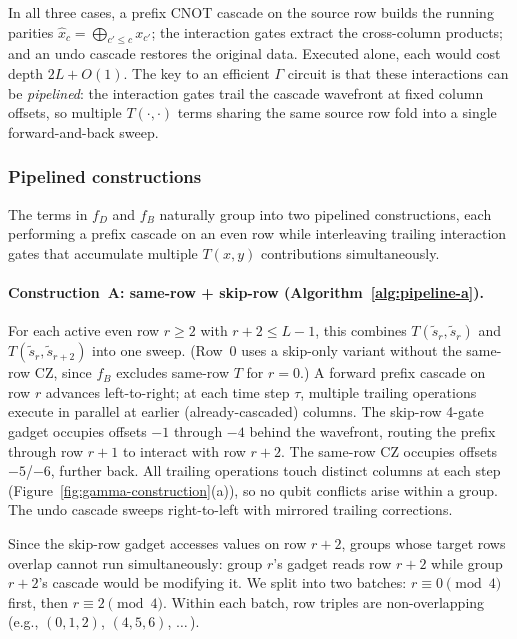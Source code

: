 \medskip
In all three cases, a prefix CNOT cascade on the source row builds the running parities $\hat{x}_c = \bigoplus_{c' \le c} x_{c'}$; the interaction gates extract the cross-column products; and an undo cascade restores the original data.
Executed alone, each would cost depth $2L + O(1)$.
The key to an efficient $\Gamma$ circuit is that these interactions can be \emph{pipelined}: the interaction gates trail the cascade wavefront at fixed column offsets, so multiple $T(\cdot,\cdot)$ terms sharing the same source row fold into a single forward-and-back sweep.


\subsubsection{Pipelined constructions}
\label{sec:gamma-pipelines}

The terms in $f_D$ and $f_B$ naturally group into two pipelined constructions, each performing a prefix cascade on an even row while interleaving trailing interaction gates that accumulate multiple $T(x,y)$ contributions simultaneously.

\paragraph{Construction~A: same-row + skip-row (Algorithm~\ref{alg:pipeline-a}).}
For each active even row $r \ge 2$ with $r{+}2 \le L{-}1$, this combines $T(\tilde{s}_r, \tilde{s}_r)$ and $T(\tilde{s}_r, \tilde{s}_{r+2})$ into one sweep.
(Row~$0$ uses a skip-only variant without the same-row CZ, since $f_B$ excludes same-row $T$ for $r = 0$.)
A forward prefix cascade on row $r$ advances left-to-right; at each time step $\tau$, multiple trailing operations execute in parallel at earlier (already-cascaded) columns.
The skip-row 4-gate gadget occupies offsets $-1$ through $-4$ behind the wavefront, routing the prefix through row $r{+}1$ to interact with row $r{+}2$.
The same-row CZ occupies offsets $-5$/$-6$, further back.
All trailing operations touch distinct columns at each step (Figure~\ref{fig:gamma-construction}(a)), so no qubit conflicts arise within a group.
The undo cascade sweeps right-to-left with mirrored trailing corrections.

Since the skip-row gadget accesses values on row $r{+}2$, groups whose target rows overlap cannot run simultaneously: group $r$'s gadget reads row $r{+}2$ while group $r{+}2$'s cascade would be modifying it.
We split into two batches: $r \equiv 0 \pmod{4}$ first, then $r \equiv 2 \pmod{4}$.
Within each batch, row triples are non-overlapping (e.g., $(0,1,2)$, $(4,5,6)$, $\ldots$\,).

